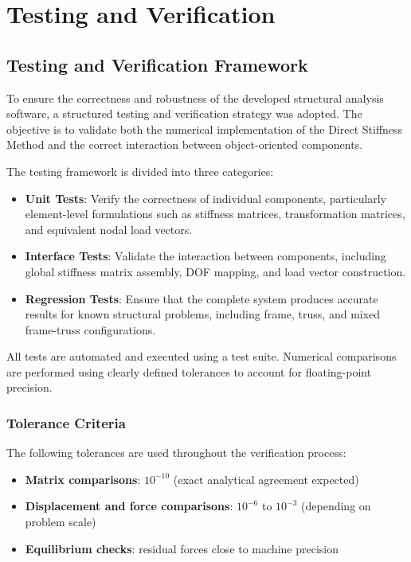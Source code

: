 \chapter{Testing and Verification}

\section{Testing and Verification Framework}

To ensure the correctness and robustness of the developed structural analysis software, a structured testing and verification strategy was adopted. The objective is to validate both the numerical implementation of the Direct Stiffness Method and the correct interaction between object-oriented components.

The testing framework is divided into three categories:

\begin{itemize}
    \item \textbf{Unit Tests}: Verify the correctness of individual components, particularly element-level formulations such as stiffness matrices, transformation matrices, and equivalent nodal load vectors.

    \item \textbf{Interface Tests}: Validate the interaction between components, including global stiffness matrix assembly, DOF mapping, and load vector construction.

    \item \textbf{Regression Tests}: Ensure that the complete system produces accurate results for known structural problems, including frame, truss, and mixed frame-truss configurations.
\end{itemize}

All tests are automated and executed using a test suite. Numerical comparisons are performed using clearly defined tolerances to account for floating-point precision.

\subsection*{Tolerance Criteria}

The following tolerances are used throughout the verification process:

\begin{itemize}
    \item \textbf{Matrix comparisons}: $10^{-10}$ (exact analytical agreement expected)
    \item \textbf{Displacement and force comparisons}: $10^{-6}$ to $10^{-3}$ (depending on problem scale)
    \item \textbf{Equilibrium checks}: residual forces close to machine precision
\end{itemize}

